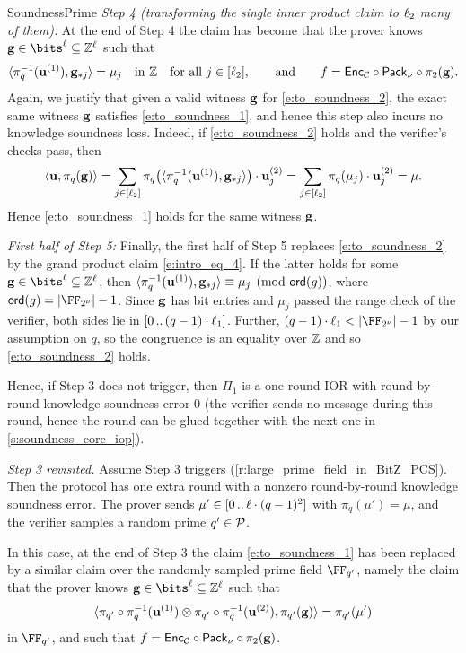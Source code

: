 \begin{lncsmove}{SoundnessPrime}
\emph{Step 4 (transforming the single inner product claim to $\ell_2$ many of them):} At the end of Step 4 the  claim has become that the prover knows $\bfg\in \bits^{\codedim}\subseteq \ZZ^\codedim$ such that
%
\begin{equation}\label{e:to_soundness_2}
\langle \pi_q^{-1}(\mathbf{u}^{(1)}), \mathbf{g}_{*j}\rangle =\mu_j \quad \text{in  } \mathbb{Z} \quad \text{for all } j\in [\ell_2], \qquad \text{and} \qquad f= \mathsf{Enc}_{\mathcal{C}} \circ \mathsf{Pack}_\nu\circ \pi_2(\mathbf{g}).
\end{equation}
%
Again, we justify that given a valid witness $\mathbf{g}$ for \eqref{e:to_soundness_2}, the exact same witness $\mathbf{g}$ satisfies \eqref{e:to_soundness_1}, and hence this step also incurs no knowledge soundness loss. Indeed, 
 if \eqref{e:to_soundness_2} holds and the verifier's checks pass, then 
$$
\langle \mathbf{u},\pi_q(\mathbf{g})\rangle = \sum_{j\in [\ell_2]} \pi_q\bigl(\langle \pi_q^{-1}(\mathbf{u}^{(1)}), \mathbf{g}_{*j}\rangle\bigr)\cdot \mathbf{u}^{(2)}_j = \sum_{j\in [\ell_2]} \pi_q(\mu_j)\cdot \mathbf{u}_j^{(2)}=\mu.
$$
%
Hence \eqref{e:to_soundness_1} holds for the same  witness $\mathbf{g}$.


\emph{First half of Step 5:} Finally, the first half of Step 5 replaces \eqref{e:to_soundness_2} by the grand product claim \eqref{e:intro_eq_4}. If the latter holds for some $\bfg\in \bits^{\codedim}\subseteq \ZZ^\codedim$, then $\langle \pi_q^{-1}(\mathbf{u}^{(1)}), \mathbf{g}_{*j}\rangle \equiv \mu_j \pmod{\mathsf{ord}(g)}$, where $\mathsf{ord}(g)=|\comfield|-1$. Since $\mathbf{g}$ has bit entries and $\mu_j$ passed the range check of the verifier, both sides lie in $[0 \, .. \, (q-1)\cdot \ell_1]$. Further,  $(q-1)\cdot \codedim_1<|\comfield|-1$ by our assumption on $q$, so the congruence is an equality over $\mathbb{Z}$ and so \eqref{e:to_soundness_2} holds. 

Hence, if Step 3 does not trigger, then $\Pi_1$ is a one-round IOR with  round-by-round knowledge soundness error $0$ (the verifier sends no message during this round, hence the round can be glued together with the next one in \cref{s:soundness_core_iop}).


\emph{Step 3 revisited.} Assume Step 3 triggers (\cref{r:large_prime_field_in_BitZ_PCS}). Then the protocol has one extra round with a nonzero round-by-round knowledge soundness error. The prover sends $\mu'\in [0 \, .. \, \ell\cdot (q-1)^2]$ with $\pi_q(\mu')=\mu$, and the verifier samples a random prime $q'\in\mathcal{P}$.

In this case, at the end of Step 3 the claim \eqref{e:to_soundness_1} has been replaced by a similar claim over the randomly sampled prime field $\FF_{q'}$, namely the claim that the prover knows $\bfg\in \bits^{\codedim} \subseteq \ZZ^\codedim$  such that $$\langle \pi_{q'}\circ\pi_q^{-1}(\mathbf{u}^{(1)})\otimes \pi_{q'}\circ\pi_q^{-1}(\mathbf{u}^{(2)}), \pi_{q'}(\mathbf{g})\rangle=\pi_{q'}(\mu')$$ in $\FF_{q'}$, and such that $f = \mathsf{Enc}_{\mathcal{C}} \circ \mathsf{Pack}_\nu \circ\pi_2(\mathbf{g})$.


\end{lncsmove}
